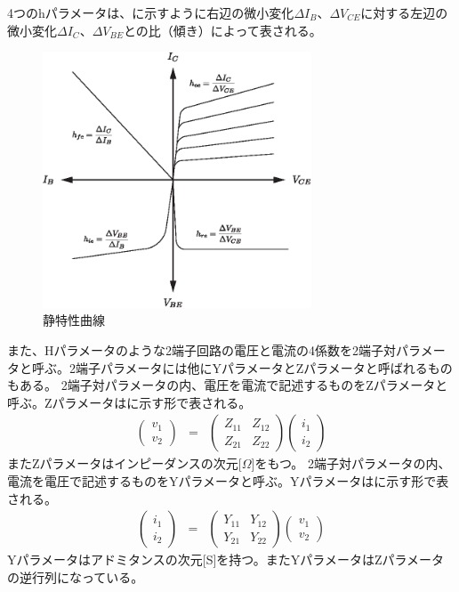 \documentclass[11pt,dvipdfmx]{jarticle}
\begin{document}
4つのhパラメータは、に示すように右辺の微小変化$\Delta I_B$、$\Delta V_{CE}$に対する左辺の微小変化$\Delta I_C$、$\Delta V_{BE}$との比（傾き）によって表される。
\begin{figure}[H]
	\centering
	\includegraphics[width=80mm]{fig/hparam.eps}
	\caption{静特性曲線}
	\label{fig:ch_h}
\end{figure}
また、Hパラメータのような2端子回路の電圧と電流の4係数を2端子対パラメータと呼ぶ。2端子パラメータには他にYパラメータとZパラメータと呼ばれるものもある。
2端子対パラメータの内、電圧を電流で記述するものをZパラメータと呼ぶ。Zパラメータはに示す形で表される。
\begin{eqnarray}
	\begin{pmatrix}v_1\\v_2\end{pmatrix}&=&\begin{pmatrix}Z_{11}&Z_{12}\\Z_{21}&Z_{22}\end{pmatrix}\begin{pmatrix}i_1\\i_2\end{pmatrix}
	\label{eq:Zパラメータ}
\end{eqnarray}
またZパラメータはインピーダンスの次元[$\Omega$]をもつ。
2端子対パラメータの内、電流を電圧で記述するものをYパラメータと呼ぶ。Yパラメータはに示す形で表される。
\begin{eqnarray}
	\begin{pmatrix}i_1\\i_2\end{pmatrix}&=&\begin{pmatrix}Y_{11}&Y_{12}\\Y_{21}&Y_{22}\end{pmatrix}\begin{pmatrix}v_1\\v_2\end{pmatrix}
	\label{eq:Yパラメータ}
\end{eqnarray}
Yパラメータはアドミタンスの次元[S]を持つ。またYパラメータはZパラメータの逆行列になっている。
\end{document}
